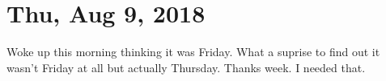 \section{Thu, Aug 9, 2018}

Woke up this morning thinking it was Friday. What a suprise to find out it wasn't
Friday at all but actually Thursday. Thanks week. I needed that.
